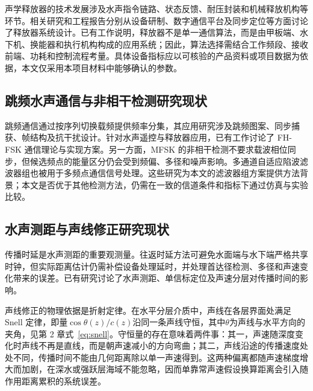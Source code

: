 声学释放器的技术发展涉及水声指令链路、状态反馈、耐压封装和机械释放机构等环节。相关研究和工程报告分别从设备研制、数字通信平台及同步定位等方面讨论了释放器系统设计\cite{QiuJianJunShengXueShiFangQiYanZhi2006,WangQiShengXueShiFangXiTongShuZiPingTaiSheJiJiZaiTongBuDingWeiXiTongZhongYingYong2009,DengChaoDuoGongNengShengXueShiFangQiRuanYingJianPingTaiSheJiYuShiXian2016}。已有工作说明，释放器不是单一通信算法，而是由甲板端、水下机、换能器和执行机构构成的应用系统；因此，算法选择需结合工作频段、接收前端、功耗和控制流程考量。具体设备指标应以可核验的产品资料或项目数据为依据，本文仅采用本项目材料中能够确认的参数。

\subsection{跳频水声通信与非相干检测研究现状}

跳频通信通过按序列切换载频提供频率分集，其应用研究涉及跳频图案、同步捕获、帧结构及抗干扰设计\cite{ZhaoXiangWuTiaoPinTongXinTongBuJiShuFaZhanZongShu2018,SongDongPoTiaoPinXuLieSheJiYanJiuXianZhuangYuWeiLaiFaZhan2024,liuProspectsProblemsWireless2008}。针对水声遥控与释放器应用，已有工作讨论了 FH-FSK 通信理论与实现方案\cite{LiBoDuoYongHuShuiShengFHMFSKTongXinJiShuLiLunYuShiXianYanJiu2018,liuFHFSKRemoteControl2021}。另一方面，MFSK 的非相干检测不要求载波相位同步，但候选频点的能量区分仍会受到频偏、多径和噪声影响。多通道自适应陷波滤波器组也被用于多频点通信信号处理\cite{FuJinDuoTongDaoZiGuaYingXianBoLuBoQiZuSheJiJiXingNengFenXi2007,ZhuFengYiZhongJiYuDuoTongDaoNotchLuBoQiDeTongXinFangFa2019}。这些研究为本文的滤波器组方案提供方法背景；本文是否优于其他检测方法，仍需在一致的信道条件和指标下通过仿真与实验比较。

\subsection{水声测距与声线修正研究现状}

传播时延是水声测距的重要观测量。往返时延方法可避免水面端与水下端严格共享时钟，但实际距离估计仍需补偿设备处理延时，并处理首达径检测、多径和声速变化带来的误差。已有研究讨论了水声测距、单信标定位及声速分层对传播时间的影响\cite{HuAnPingShuiShengCeJuJiShuYanJiu2014,YuYanTingDanXinBiaoShuiShengDingWeiJiShuYanJiuXianZhuangJiYingYongZhanWang2022,bergerStratificationEffectCompensation2008,sunRelationshipPropagationTime2019}。

声线修正的物理依据是折射定律。在水平分层介质中，声线在各层界面处满足 Snell 定律，即量$\cos\theta(z)/c(z)$沿同一条声线守恒，其中$\theta$为声线与水平方向的夹角，见第 2 章式~\eqref{eq:snell}。守恒量的存在意味着两件事：其一，声速随深度变化时声线不再是直线，而是朝声速减小的方向弯曲；其二，声线沿途的传播速度处处不同，传播时间不能由几何距离除以单一声速得到。这两种偏离都随声速梯度增大而加剧，在深水或强跃层海域不能忽略，因而单靠常声速假设换算距离会引入随作用距离累积的系统误差。


